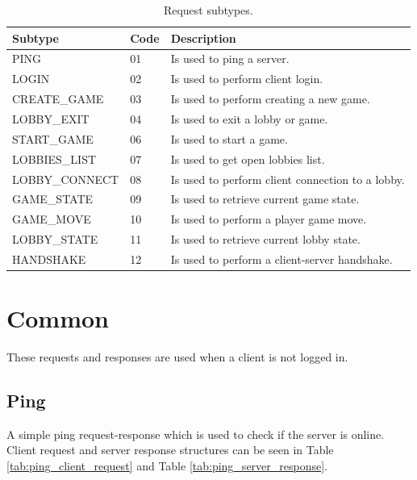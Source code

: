 \documentclass[english, sem, kiv, he, iso690alph, pdf, viewonly]{fasthesis}
\begin{document}
\begin{table}[h!]
	\centering
	\begin{tabular}{|l|l|l|}
		\hline
		\textbf{Subtype} & \textbf{Code} & \textbf{Description} \\ \hline
		PING & 01 & Is used to ping a server. \\ \hline
		LOGIN & 02 & Is used to perform client login. \\ \hline
		CREATE\_GAME & 03 & Is used to perform creating a new game. \\ \hline
		LOBBY\_EXIT & 04 & Is used to exit a lobby or game. \\ \hline
		START\_GAME & 06 & Is used to start a game. \\ \hline
		LOBBIES\_LIST & 07 & Is used to get open lobbies list. \\ \hline
		LOBBY\_CONNECT & 08 & Is used to perform client connection to a lobby. \\ \hline
		GAME\_STATE & 09 & Is used to retrieve current game state. \\ \hline
		GAME\_MOVE & 10 & Is used to perform a player game move. \\ \hline
		LOBBY\_STATE & 11 & Is used to retrieve current lobby state. \\ \hline
		HANDSHAKE & 12 & Is used to perform a client-server handshake. \\ \hline
	\end{tabular}
	\caption{Request subtypes.}
	\label{tab:request_subtypes}
\end{table}


\section{Common}
These requests and responses are used when a client is not logged in.

\subsection{Ping}
A simple ping request-response which is used to check if the server is online. Client request and server response structures can be seen in Table \ref{tab:ping_client_request} and Table \ref{tab:ping_server_response}.
\end{document}
